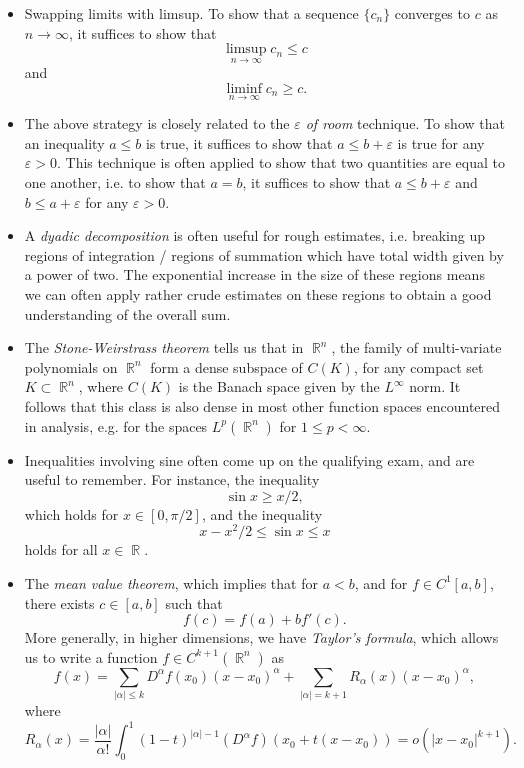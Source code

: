 \documentclass[answers]{exam}
\DeclareMathOperator{\RR}{\mathbb{R}}
\theoremstyle{problemstyle}
\newcommand{\1}[1]{\textbf{1}_{\left[#1\right]}} %
\begin{document}
\begin{itemize}
	\item Swapping limits with limsup. To show that a sequence $\{ c_n \}$ converges to $c$ as $n \to \infty$, it suffices to show that
	\[ \limsup_{n \to \infty} c_n \leq c \]
	and
	\[ \liminf_{n \to \infty} c_n \geq c. \]

	\item The above strategy is closely related to the \emph{$\varepsilon$ of room} technique. To show that an inequality $a \leq b$ is true, it suffices to show that $a \leq b + \varepsilon$ is true for any $\varepsilon > 0$. This technique is often applied to show that two quantities are equal to one another, i.e. to show that $a = b$, it suffices to show that $a \leq b + \varepsilon$ and $b \leq a + \varepsilon$ for any $\varepsilon > 0$.

	\item A \emph{dyadic decomposition} is often useful for rough estimates, i.e. breaking up regions of integration / regions of summation which have total width given by a power of two. The exponential increase in the size of these regions means we can often apply rather crude estimates on these regions to obtain a good understanding of the overall sum.

	\item The \emph{Stone-Weirstrass theorem} tells us that in $\RR^n$, the family of multi-variate polynomials on $\RR^n$ form a dense subspace of $C(K)$, for any compact set $K \subset \RR^n$, where $C(K)$ is the Banach space given by the $L^\infty$ norm. It follows that this class is also dense in most other function spaces encountered in analysis, e.g. for the spaces $L^p(\RR^n)$ for $1 \leq p < \infty$.

	\item Inequalities involving sine often come up on the qualifying exam, and are useful to remember. For instance, the inequality
	\[ \sin x \geq x/2, \]
	which holds for $x \in [0, \pi/2]$, and the inequality
	\[ x - x^2/2 \leq \sin x \leq x \]
	holds for all $x \in \RR$.

	\item The \emph{mean value theorem}, which implies that for $a < b$, and for $f \in C^1[a,b]$, there exists $c \in [a,b]$ such that
	\[ f(c) = f(a) + b f'(c). \]
	More generally, in higher dimensions, we have \emph{Taylor's formula}, which allows us to write a function $f \in C^{k+1}(\RR^n)$ as
	\[ f(x) = \sum_{|\alpha| \leq k} D^\alpha f(x_0) (x - x_0)^\alpha + \sum_{|\alpha| = k+1} R_\alpha(x) (x - x_0)^\alpha, \]
	where
	\[ R_\alpha(x) = \frac{|\alpha|}{\alpha!} \int_0^1 (1 - t)^{|\alpha|-1} (D^\alpha f)(x_0 + t(x - x_0)) = o(|x - x_0|^{k+1}). \]


\end{itemize}
\end{document}
